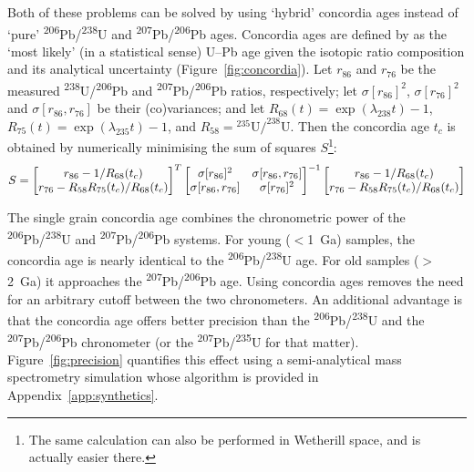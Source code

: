 \documentclass{article}
\begin{document}
Both of these problems can be solved by using `hybrid' concordia ages
instead of `pure' \textsuperscript{206}Pb/\textsuperscript{238}U and
\textsuperscript{207}Pb/\textsuperscript{206}Pb ages. Concordia ages
are defined by \citet{ludwig1998} as the `most likely' (in a
statistical sense) U--Pb age given the isotopic ratio composition and
its analytical uncertainty (Figure~\ref{fig:concordia}).  Let $r_{86}$
and $r_{76}$ be the measured
\textsuperscript{238}U/\textsuperscript{206}Pb and
\textsuperscript{207}Pb/\textsuperscript{206}Pb ratios, respectively;
let $\sigma[r_{86}]^2$, $\sigma[r_{76}]^2$ and $\sigma[r_{86},r_{76}]$
be their (co)variances; and let $R_{68}(t) = \exp(\lambda_{238}t) -
1$, $R_{75}(t) = \exp(\lambda_{235}t) - 1$, and $R_{58} =
{}^{235}\mbox{U/}^{238}\mbox{U}$.  Then the concordia age $t_c$ is
obtained by numerically minimising the sum of squares $S$\footnote{The
  same calculation can also be performed in Wetherill space, and is
  actually easier there.}:
\begin{equation}
  S = \left[
    \begin{array}{@{}c@{}}
      r_{86} - 1/R_{68}(t_c) \\
      r_{76} - R_{58} R_{75}(t_c)/R_{68}(t_c)
    \end{array}
    \right]^T\left[
    \begin{array}{@{}cc@{}}
      \sigma[r_{86}]^2 & \sigma[r_{86},r_{76}] \\
      \sigma[r_{86},r_{76}] & \sigma[r_{76}]^2
    \end{array}
    \right]^{-1}
  \left[
    \begin{array}{@{}c@{}}
      r_{86} - 1/R_{68}(t_c) \\
      r_{76} - R_{58} R_{75}(t_c)/R_{68}(t_c)
    \end{array}
    \right]
  \label{eq:S}
\end{equation}

The single grain concordia age combines the chronometric power of the
\textsuperscript{206}Pb/\textsuperscript{238}U and
\textsuperscript{207}Pb/\textsuperscript{206}Pb systems. For young
($<$1~Ga) samples, the concordia age is nearly identical to the
\textsuperscript{206}Pb/\textsuperscript{238}U age. For old samples
($>$2~Ga) it approaches the
\textsuperscript{207}Pb/\textsuperscript{206}Pb age. Using concordia
ages removes the need for an arbitrary cutoff between the two
chronometers. An additional advantage is that the concordia age offers
better precision than the
\textsuperscript{206}Pb/\textsuperscript{238}U and the
\textsuperscript{207}Pb/\textsuperscript{206}Pb chronometer (or the
\textsuperscript{207}Pb/\textsuperscript{235}U for that matter).
Figure~\ref{fig:precision} quantifies this effect using a
semi-analytical mass spectrometry simulation whose algorithm is
provided in Appendix~\ref{app:synthetics}.
\end{document}
